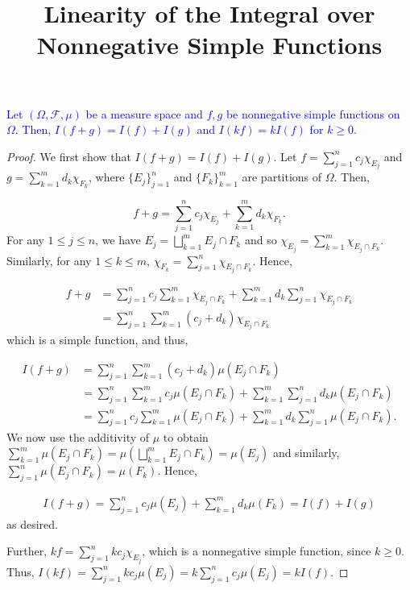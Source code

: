 \documentclass[12pt]{extarticle}
\title{Linearity of the Integral over Nonnegative Simple Functions}
\author{}
\date{}
\newcommand{\F}{\mathscr{F}}
\begin{document}
\maketitle

\textcolor{blue}{Let $(\Omega, \F, \mu)$ be a measure space and $f, g$ be nonnegative simple functions on $\Omega$. Then, $I(f + g) = I(f) + I(g)$ and $I(kf) = kI(f)$ for $k \geq 0$.
}

\begin{proof}

We first show that $I(f + g) = I(f) + I(g)$. Let $f = \sum_{j = 1}^{n} c_j \chi_{E_j}$ and $g = \sum_{k = 1}^{m} d_k \chi_{F_k}$, where $\{E_j\}_{j = 1}^{n}$ and $\{F_k\}_{k = 1}^{m}$ are partitions of $\Omega$. Then, 

$$ f + g = \sum_{j=1}^{n} c_j \chi_{E_j} + \sum_{k=1}^{m} d_k \chi_{F_k}.$$
For any $1 \leq j \leq n$, we have $E_j = \bigsqcup_{k = 1}^{m} E_j \cap F_k$ and so $\chi_{E_j} = \sum_{k=1}^{m}\chi_{E_j \cap F_k}$. Similarly, for any $1 \leq k \leq m$, $\chi_{F_k} = \sum_{j=1}^{n}\chi_{E_j \cap F_k}$. Hence,

\begin{align*}
    f + g &= \sum_{j = 1}^{n} c_j\sum_{k=1}^{m}\chi_{E_j \cap F_k} + \sum_{k = 1}^{m} d_k \sum_{j = 1}^{n} \chi_{E_j \cap F_k} \\
    &= \sum_{j = 1}^{n}\sum_{k=1}^{m} (c_j + d_k) \chi_{E_j \cap F_k}
\end{align*}
which is a simple function, and thus, 

\begin{align*}
    I(f + g) &= \sum_{j = 1}^{n}\sum_{k=1}^{m} (c_j + d_k) \mu(E_j \cap F_k) \\
    &= \sum_{j = 1}^{n}\sum_{k=1}^{m} c_j \mu(E_j \cap F_k) + \sum_{k = 1}^{m}\sum_{j=1}^{n} d_k \mu(E_j \cap F_k) \\
    &= \sum_{j=1}^{n}c_j \sum_{k=1}^{m}\mu(E_j \cap F_k) + \sum_{k=1}^{m} d_k \sum_{j=1}^{n} \mu(E_j \cap F_k).
\end{align*}
We now use the additivity of $\mu$ to obtain $\sum_{k = 1}^m \mu(E_j \cap F_k) = \mu(\bigsqcup_{k=1}^m E_j \cap F_k) = \mu(E_j)$ and similarly, $\sum_{j=1}^{n} \mu(E_j \cap F_k) = \mu(F_k)$. Hence, 

\begin{align*}
    I(f + g) = \sum_{j = 1}^n c_j \mu(E_j) + \sum_{k = 1}^{m} d_k \mu(F_k) = I(f) + I(g)
\end{align*}
as desired.

Further, $kf = \sum_{j = 1}^{n} kc_j \chi_{E_j}$, which is a nonnegative simple function, since $k \geq 0$. Thus, $I(kf) = \sum_{j = 1}^n kc_j \mu(E_j) = k \sum_{j = 1}^n c_j\mu(E_j) = kI(f).$

\end{proof}
\end{document}
